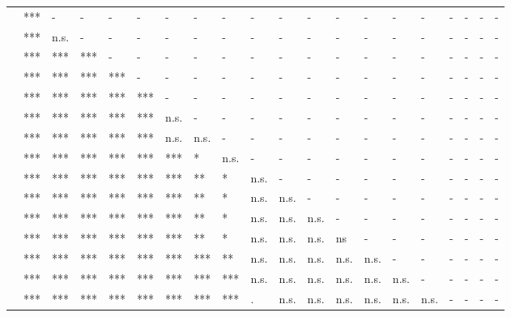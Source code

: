 \documentclass[11pt,fleqn]{article}
\newcommand{\6}{\mbox{$[\hspace*{-.6mm}[$}}
\newcommand{\9}{\mbox{$]\hspace*{-.6mm}]$}}
\begin{document}
\begin{table}[h!]
\begin{tabular}{l l l l l l l l l l l l l l l l l l l l }
\color{brown}{\em think}\color{black}		& *** & - & - & - & - & - & - & - & - & - & - & - & - & - & - & - & - & - & - \\
\color{brown}{\em suggest}\color{black}			& *** & n.s. & - & - & - & - & - & - & - & - & - & - & - & - & - & - & - & - & - \\
\color{blue}{\em hear}	\color{black}		& *** & *** & *** & - & - & - & - & - & - & - & - & - & - & - & - & - & - & - & - \\
\color{brown}{\em say}\color{black}		& *** & *** & *** & *** & - & - & - & - & - & - & - & - & - & - & - & - & - & - & - \\
\color{black}{\em announce}\color{black}		& *** & *** & *** & *** & *** & - & - & - & - & - & - & - & - & - & - & - & - & - & - \\
\color{black}{\em inform}\color{black}		& *** & *** & *** & *** & *** & n.s. & - & - & - & - & - & - & - & - & - & - & - & - & - \\
\color{airforceblue}{\em demonstrate}\color{black}		& *** & *** & *** & *** & *** & n.s. & n.s. & - & - & - & - & - & - & - & - & - & - & - & - \\
\color{black}{\em confess}\color{black}		& *** & *** & *** & *** & *** & *** & * & n.s. & - & - & - & - & - & - & - & - & - & - & - \\
\color{blue}{\em reveal}\color{black}		& *** & *** & *** & *** & *** & *** & ** & * & n.s. & - & - & - & - & - & - & - & - & - & - \\
\color{black}{\em acknowledge}\color{black}	& *** & *** & *** & *** & *** & *** & ** & * & n.s. & n.s. & - & - & - & - & - & - & - & - & - \\
\color{black}{\em admit}\color{black}			& *** & *** & *** & *** & *** & *** & ** & * & n.s. & n.s. & n.s. & - & - & - & - & - & - & - & - \\
\color{black}{\em establish}\color{black}		& *** & *** & *** & *** & *** & *** & ** & * & n.s. & n.s. & n.s. &  ns & - & - & - & - & - & - & - \\
\color{blue}{\em be annoyed}\color{black}	& *** & *** & *** & *** & *** & *** & *** & ** & n.s. & n.s. & n.s. & n.s. & n.s. & - & - & - & - & - & - \\
\color{blue}{\em know}\color{black}		& *** & *** & *** & *** & *** & *** & *** & *** & n.s. & n.s. & n.s. & n.s. & n.s. & n.s. & - & - & - & - & - \\
\color{black}{\em confirm}\color{black}		& *** & *** & *** & *** & *** & *** & *** & *** & . & n.s. & n.s. & n.s. & n.s. & n.s. & n.s. & - & - & - & - \\

\end{tabular}
\end{table}
\end{document}
